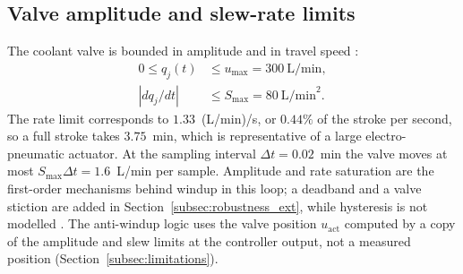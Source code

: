 \subsection{Valve amplitude and slew-rate limits}
\label{subsec:actuator_limits}
The coolant valve is bounded in amplitude and in travel speed \cite{hippe2006windup, tarbouriech2009antiwindup}:
\begin{align}
    0 \le q_j(t) &\le u_{\max} = 300~\text{L/min}, \nonumber \\
    \left|dq_j/dt\right| &\le S_{\max} = 80~\text{L/min}^2.
    \label{eq:actuator_limits}
\end{align}
The rate limit corresponds to $1.33$~(L/min)/s, or $0.44\%$ of the stroke per second, so a full stroke takes $3.75$~min, which is representative of a large electro-pneumatic actuator. At the sampling interval $\Delta t = 0.02$~min the valve moves at most $S_{\max}\Delta t = 1.6$~L/min per sample. Amplitude and rate saturation are the first-order mechanisms behind windup in this loop; a deadband and a valve stiction are added in Section~\ref{subsec:robustness_ext}, while hysteresis is not modelled \cite{choudhury2005modelling}. The anti-windup logic uses the valve position $u_{\text{act}}$ computed by a copy of the amplitude and slew limits at the controller output, not a measured position (Section~\ref{subsec:limitations}).
